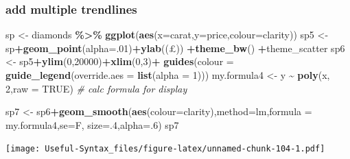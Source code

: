 \documentclass[
]{article}
\newenvironment{Shaded}{\begin{snugshade}}{\end{snugshade}}
\newcommand{\AttributeTok}[1]{\textcolor[rgb]{0.13,0.29,0.53}{#1}}
\newcommand{\CommentTok}[1]{\textcolor[rgb]{0.56,0.35,0.01}{\textit{#1}}}
\newcommand{\ConstantTok}[1]{\textcolor[rgb]{0.56,0.35,0.01}{#1}}
\newcommand{\DecValTok}[1]{\textcolor[rgb]{0.00,0.00,0.81}{#1}}
\newcommand{\FunctionTok}[1]{\textcolor[rgb]{0.13,0.29,0.53}{\textbf{#1}}}
\newcommand{\NormalTok}[1]{#1}
\newcommand{\OtherTok}[1]{\textcolor[rgb]{0.56,0.35,0.01}{#1}}
\newcommand{\SpecialCharTok}[1]{\textcolor[rgb]{0.81,0.36,0.00}{\textbf{#1}}}
\newcommand{\StringTok}[1]{\textcolor[rgb]{0.31,0.60,0.02}{#1}}
\begin{document}
\hypertarget{add-multiple-trendlines}{%
\subsubsection{add multiple trendlines}\label{add-multiple-trendlines}}

\begin{Shaded}
\begin{Highlighting}[]
\NormalTok{sp }\OtherTok{\textless{}{-}}\NormalTok{ diamonds }\SpecialCharTok{\%\textgreater{}\%} \FunctionTok{ggplot}\NormalTok{(}\FunctionTok{aes}\NormalTok{(}\AttributeTok{x=}\NormalTok{carat,}\AttributeTok{y=}\NormalTok{price,}\AttributeTok{colour=}\NormalTok{clarity))}
\NormalTok{sp5 }\OtherTok{\textless{}{-}}\NormalTok{ sp}\SpecialCharTok{+}\FunctionTok{geom\_point}\NormalTok{(}\AttributeTok{alpha=}\NormalTok{.}\DecValTok{01}\NormalTok{)}\SpecialCharTok{+}\FunctionTok{ylab}\NormalTok{(}\StringTok{\textquotesingle{}(£)\textquotesingle{}}\NormalTok{) }\SpecialCharTok{+}\FunctionTok{theme\_bw}\NormalTok{() }\SpecialCharTok{+}\NormalTok{theme\_scatter}
\NormalTok{sp6 }\OtherTok{\textless{}{-}}\NormalTok{ sp5}\SpecialCharTok{+}\FunctionTok{ylim}\NormalTok{(}\DecValTok{0}\NormalTok{,}\DecValTok{20000}\NormalTok{)}\SpecialCharTok{+}\FunctionTok{xlim}\NormalTok{(}\DecValTok{0}\NormalTok{,}\DecValTok{3}\NormalTok{)}\SpecialCharTok{+} \FunctionTok{guides}\NormalTok{(}\AttributeTok{colour =} \FunctionTok{guide\_legend}\NormalTok{(}\AttributeTok{override.aes =} \FunctionTok{list}\NormalTok{(}\AttributeTok{alpha =} \DecValTok{1}\NormalTok{)))}
\NormalTok{my.formula4 }\OtherTok{\textless{}{-}}\NormalTok{ y }\SpecialCharTok{\textasciitilde{}} \FunctionTok{poly}\NormalTok{(x, }\DecValTok{2}\NormalTok{,}\AttributeTok{raw =} \ConstantTok{TRUE}\NormalTok{) }\CommentTok{\# calc formula for display}

\NormalTok{sp7 }\OtherTok{\textless{}{-}}\NormalTok{ sp6}\SpecialCharTok{+}\FunctionTok{geom\_smooth}\NormalTok{(}\FunctionTok{aes}\NormalTok{(}\AttributeTok{colour=}\NormalTok{clarity),}\AttributeTok{method=}\StringTok{\textquotesingle{}lm\textquotesingle{}}\NormalTok{,}\AttributeTok{formula =}\NormalTok{ my.formula4,}\AttributeTok{se=}\NormalTok{F, }\AttributeTok{size=}\NormalTok{.}\DecValTok{4}\NormalTok{,}\AttributeTok{alpha=}\NormalTok{.}\DecValTok{6}\NormalTok{)}
\NormalTok{sp7}
\end{Highlighting}
\end{Shaded}

\texttt{[image: Useful-Syntax\_files/figure-latex/unnamed-chunk-104-1.pdf]}
\end{document}
